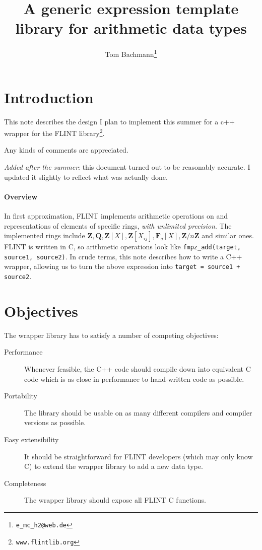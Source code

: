 \documentclass{scrartcl}
\title{A generic expression template library for arithmetic data types}
\author{Tom Bachmann\footnote{\texttt{e\_mc\_h2@web.de}}}
\begin{document}
\maketitle

\section*{Introduction}

  This note describes the design I plan to implement this summer for a c++
wrapper for the FLINT library\footnote{\texttt{www.flintlib.org}}.

Any kinds of comments are appreciated.

\emph{Added after the summer}: this document turned out to be reasonably
accurate. I updated it slightly to reflect what was actually done.

\paragraph{Overview}
In first approximation, FLINT implements arithmetic operations on and
representations of elements of specific rings, \emph{with unlimited
precision}. The implemented rings include $\mathbf{Z}, \mathbf{Q},
\mathbf{Z}[X], \mathbf{Z}[X_{ij}], \mathbf{F}_q[X], \mathbf{Z}/n\mathbf{Z}$
and similar ones. FLINT is written in C, so arithmetic operations look like
\texttt{fmpz\_add(target, source1, source2)}. In crude terms, this note
describes how to write a C++ wrapper, allowing us to turn the above
expression into \texttt{target = source1 + source2}.


\section*{Objectives}

The wrapper library has to satisfy a number of competing objectives:

\begin{description}
\item[Performance] Whenever feasible, the C++ code should compile down into
    equivalent C code which is as close in performance to hand-written code as
    possible.
\item[Portability] The library should be usable on as many different
    compilers and compiler versions as possible.
\item[Easy extensibility] It should be straightforward for FLINT developers
    (which may only know C) to extend the wrapper library to add a new data
    type.
\item[Completeness] The wrapper library should expose all FLINT C
    functions.
\end{description}
\end{document}
